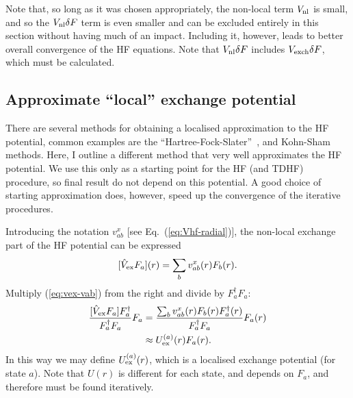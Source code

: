 \documentclass[10pt,twocolumn,a4paper]{article}%
\newcommand{\be}{\begin{equation}}
\newcommand{\ee}{\end{equation}}
\begin{document}
Note that, so long as it was chosen appropriately, the non-local term $V_{\rm nl}$ is small, and so the $V_{\rm nl}\delta F$ term is even smaller and can be excluded entirely in this section without having much of an impact.
Including it, however, leads to better overall convergence of the HF equations.
Note that $V_{\rm nl} \delta F$ includes $V_{\rm exch} \delta F$, which must be calculated.




\subsection{Approximate ``local'' exchange potential}\label{sec:hf-approx}


There are several methods for obtaining a localised approximation to the HF potential, common  examples are the ``Hartree-Fock-Slater''~\cite{Slater1951}, and Kohn-Sham methods.
%
Here, I outline a different method that very well approximates the HF potential. 
We use this only as a starting point for the HF (and TDHF) procedure, so final result do not depend on this potential. 
A good choice of starting approximation does, however, speed up the convergence of the iterative procedures.

Introducing the notation $v^x_{ab}$ [see Eq.~(\ref{eq:Vhf-radial})], the non-local exchange part of the HF potential can be expressed
\be\label{eq:vex-vab}
 [\hat V_{\rm ex}F_a](r) = \sum_b v^x_{ab}(r) F_b(r).
\ee
Multiply (\ref{eq:vex-vab}) from the right and divide  by $ F_a^\dag F_a$:
\begin{align}
 \frac{[\hat V_{\rm ex}F_a] F_a^\dag }{F_a^\dag F_a} F_a
&= \frac{\sum_b v^x_{ab}(r) F_b(r)F_a^\dag(r) }{F_a^\dag F_a} F_a(r)\\
&\approx U^{(a)}_{\rm ex}(r)F_a(r).
\end{align}
In this way we may define $U^{(a)}_{\rm ex}(r)$, which is a localised exchange potential (for state $a$).
Note that $U(r)$ is different for each state, and depends on $F_a$, and therefore must be found iteratively.
\end{document}
